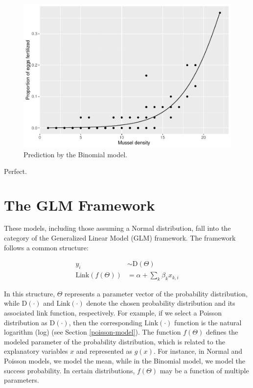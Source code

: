 \documentclass[
]{book}
\begin{document}
\begin{figure}

{\centering \includegraphics{biostats_files/figure-latex/binom-fit-figure-1} 

}

\caption{Prediction by the Binomial model.}\label{fig:binom-fit-figure}
\end{figure}

Perfect.

\hypertarget{the-glm-framework}{%
\section{The GLM Framework}\label{the-glm-framework}}

These models, including those assuming a Normal distribution, fall into the category of the Generalized Linear Model (GLM) framework. The framework follows a common structure:

\[
\begin{aligned}
y_i &\sim \text{D}(\Theta)\\
\text{Link}(f(\Theta)) &= \alpha + \sum_k \beta_k x_{k, i}
\end{aligned}
\]

In this structure, \(\Theta\) represents a parameter vector of the probability distribution, while \(\text{D}(\cdot)\) and \(\text{Link}(\cdot)\) denote the chosen probability distribution and its associated link function, respectively. For example, if we select a Poisson distribution as \(\text{D}(\cdot)\), then the corresponding \(\text{Link}(\cdot)\) function is the natural logarithm (log) (see Section \ref{poisson-model}). The function \(f(\Theta)\) defines the modeled parameter of the probability distribution, which is related to the explanatory variables \(x\) and represented as \(g(x)\). For instance, in Normal and Poisson models, we model the mean, while in the Binomial model, we model the success probability. In certain distributions, \(f(\Theta)\) may be a function of multiple parameters.
\end{document}
